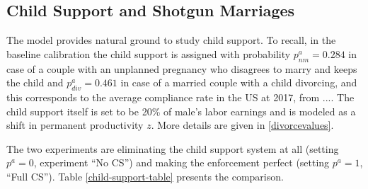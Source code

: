 \documentclass[12pt,letter]{article}
\begin{document}


\subsection{Child Support and Shotgun Marriages}
The model provides natural ground to study child support. To recall, in the baseline calibration the child support is assigned with probability $p^a_{nm} = 0.284$ in case of a couple with an unplanned pregnancy who disagrees to marry and keeps the child and $p^{a}_{div} = 0.461$ in case of a married couple with a child divorcing, and this corresponds to the average compliance rate in the US at 2017, from .... The child support itself is set to be 20\% of male's labor earnings and is modeled as a shift in permanent productivity $z$. More details are given in \ref{divorcevalues}. 

The two experiments are eliminating the child support system at all (setting $p^{a} = 0$, experiment ``No CS'') and making the enforcement perfect (setting $p^{a} = 1$, ``Full CS''). Table \ref{child-support-table} presents the comparison.
\end{document}
